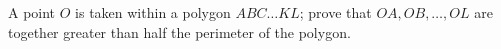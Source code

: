 A point $O$ is taken within a polygon $ABC \dots KL$;
prove that $OA, OB, \dots, OL$ are together greater than 
half the perimeter of the polygon.
